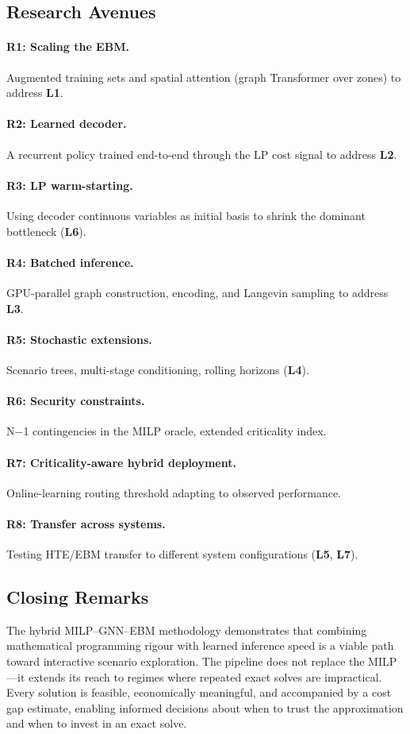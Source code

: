 \documentclass{article}
\begin{document}
\subsection{Research Avenues}

\paragraph{R1: Scaling the EBM.} Augmented training sets and spatial attention (graph Transformer over zones) to address \textbf{L1}.
\paragraph{R2: Learned decoder.} A recurrent policy trained end-to-end through the LP cost signal to address \textbf{L2}.
\paragraph{R3: LP warm-starting.} Using decoder continuous variables as initial basis to shrink the dominant bottleneck (\textbf{L6}).
\paragraph{R4: Batched inference.} GPU-parallel graph construction, encoding, and Langevin sampling to address \textbf{L3}.
\paragraph{R5: Stochastic extensions.} Scenario trees, multi-stage conditioning, rolling horizons (\textbf{L4}).
\paragraph{R6: Security constraints.} N$-$1 contingencies in the MILP oracle, extended criticality index.
\paragraph{R7: Criticality-aware hybrid deployment.} Online-learning routing threshold adapting to observed performance.
\paragraph{R8: Transfer across systems.} Testing HTE/EBM transfer to different system configurations (\textbf{L5}, \textbf{L7}).

\subsection{Closing Remarks}

The hybrid MILP--GNN--EBM methodology demonstrates that combining mathematical programming rigour with learned inference speed is a viable path toward interactive scenario exploration. The pipeline does not replace the MILP---it extends its reach to regimes where repeated exact solves are impractical. Every solution is feasible, economically meaningful, and accompanied by a cost gap estimate, enabling informed decisions about when to trust the approximation and when to invest in an exact solve.


  
       
\end{document}
